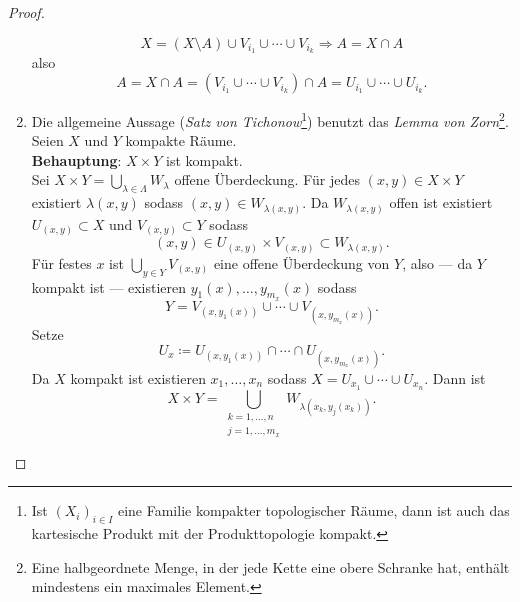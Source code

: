 \begin{theorem}
\begin{proof}
\begin{enumerate}
        \begin{equation*}
          X = (X \setminus A) \cup V_{i_1} \cup \cdots \cup V_{i_k} \Rightarrow A = X \cap A
        \end{equation*}
        also
        \begin{equation*}
          A = X \cap A = \left( V_{i_1} \cup \cdots \cup V_{i_k} \right) \cap A = U_{i_1} \cup \cdots \cup U_{i_k}\text{.}
        \end{equation*}
      \item Die allgemeine Aussage (\emph{Satz von Tichonow}\footnote{Ist $ (X_i)_{i \in I} $ eine Familie kompakter topologischer Räume, dann ist auch das kartesische Produkt mit der Produkttopologie kompakt.}) benutzt das \emph{Lemma von Zorn}\footnote{Eine halbgeordnete Menge, in der jede Kette eine obere Schranke hat, enthält mindestens ein maximales Element.}. \\
        Seien $ X $ und $ Y $ kompakte Räume. \\
        \textbf{Behauptung}: $ X \times Y $ ist kompakt. \\
        Sei $ X \times Y = \bigcup_{\lambda \in \Lambda} W_\lambda $ offene Überdeckung. Für jedes $ (x, y) \in X \times Y $ existiert $ \lambda(x, y) $ sodass $ (x,y) \in W_{\lambda(x,y)} $. Da $ W_{\lambda(x,y)} $ offen ist existiert $ U_{(x,y)} \subset X $ und $ V_{(x,y)} \subset Y $ sodass
        \begin{equation*}
          (x,y) \in U_{(x,y)} \times V_{(x,y)} \subset W_{\lambda(x,y)}\text{.}
        \end{equation*}
        Für festes $ x $ ist $ \bigcup_{y \in Y} V_{(x,y)} $ eine offene Überdeckung von $ Y $, also --- da $ Y $ kompakt ist --- existieren $ y_1(x),\dots,y_{m_x}(x) $ sodass
        \begin{equation*}
          Y = V_{(x, y_1(x))} \cup \cdots \cup V_{(x,y_{m_x}(x))}\text{.}
        \end{equation*}
        Setze
        \begin{equation*}
          U_x \coloneqq U_{(x,y_1(x))} \cap \cdots \cap U_{(x, y_{m_x}(x))}\text{.}
        \end{equation*}
        Da $ X $ kompakt ist existieren $ x_1, \dots, x_n $ sodass $ X = U_{x_1} \cup \cdots \cup U_{x_n} $. Dann ist
        \begin{equation*}
          X \times Y = \bigcup_{\substack{k = 1, \dots, n \\ j = 1, \dots, m_x}}W_{\lambda(x_k, y_j(x_k))}\text{.}
        \end{equation*}
    \end{enumerate}
  \end{proof}
\end{theorem}

